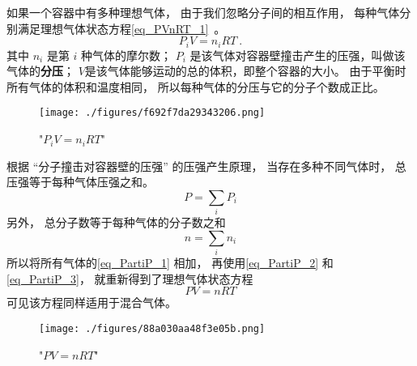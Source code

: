 

如果一个容器中有多种理想气体， 由于我们忽略分子间的相互作用， 每种气体分别满足理想气体状态方程\autoref{eq_PVnRT_1}~。
\begin{equation}\label{eq_PartiP_1}
P_i V = n_i R T~.
\end{equation}
其中 $n_i$ 是第 $i$ 种气体的摩尔数； $P_i$ 是该气体对容器壁撞击产生的压强，叫做该气体的\textbf{分压}； $V$是该气体能够运动的总的体积，即整个容器的大小。 由于平衡时所有气体的体积和温度相同， 所以每种气体的分压与它的分子个数成正比。

\begin{figure}[ht]
\centering
\texttt{[image: ./figures/f692f7da29343206.png]}
\caption{"$P_i V = n_i R T$"} \label{fig_PartiP_1}
\end{figure}

根据 “分子撞击对容器壁的压强” 的压强产生原理， 当存在多种不同气体时， 总压强等于每种气体压强之和。
\begin{equation}\label{eq_PartiP_2}
P = \sum_i P_i
\end{equation}
另外， 总分子数等于每种气体的分子数之和
\begin{equation}\label{eq_PartiP_3}
n = \sum_i n_i
\end{equation}
所以将所有气体的\autoref{eq_PartiP_1} 相加， 再使用\autoref{eq_PartiP_2} 和\autoref{eq_PartiP_3}， 就重新得到了理想气体状态方程
\begin{equation}
P V = n RT
\end{equation}
可见该方程同样适用于混合气体。

\begin{figure}[ht]
\centering
\texttt{[image: ./figures/88a030aa48f3e05b.png]}
\caption{"$P V = n RT$"} \label{fig_PartiP_2}
\end{figure}

